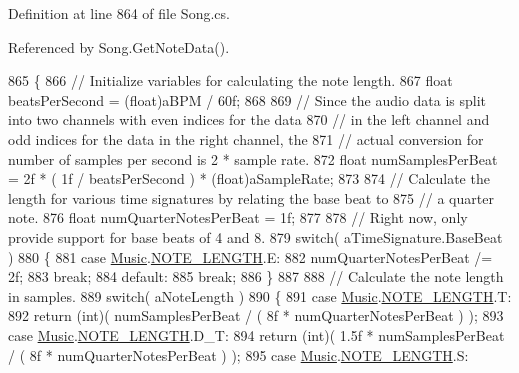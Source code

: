 Definition at line 864 of file Song.\+cs.



Referenced by Song.\+Get\+Note\+Data().


\begin{DoxyCode}
865     \{
866         \textcolor{comment}{// Initialize variables for calculating the note length.}
867         \textcolor{keywordtype}{float} beatsPerSecond = (float)aBPM / 60f;
868 
869         \textcolor{comment}{// Since the audio data is split into two channels with even indices for the data }
870         \textcolor{comment}{// in the left channel and odd indices for the data in the right channel, the}
871         \textcolor{comment}{// actual conversion for number of samples per second is 2 * sample rate.}
872         \textcolor{keywordtype}{float} numSamplesPerBeat = 2f * ( 1f / beatsPerSecond ) * (\textcolor{keywordtype}{float})aSampleRate;
873 
874         \textcolor{comment}{// Calculate the length for various time signatures by relating the base beat to }
875         \textcolor{comment}{// a quarter note. }
876         \textcolor{keywordtype}{float} numQuarterNotesPerBeat = 1f;
877 
878         \textcolor{comment}{// Right now, only provide support for base beats of 4 and 8.}
879         \textcolor{keywordflow}{switch}( aTimeSignature.BaseBeat )
880         \{
881             \textcolor{keywordflow}{case} \hyperlink{class_music}{Music}.\hyperlink{group___music_enums_gaf11b5f079adbb21c800b9eca1c5c3cbd}{NOTE\_LENGTH}.E:
882                 numQuarterNotesPerBeat /= 2f;
883                 \textcolor{keywordflow}{break};
884             \textcolor{keywordflow}{default}:
885                 \textcolor{keywordflow}{break};
886         \}
887 
888         \textcolor{comment}{// Calculate the note length in samples.}
889         \textcolor{keywordflow}{switch}( aNoteLength )
890         \{
891             \textcolor{keywordflow}{case} \hyperlink{class_music}{Music}.\hyperlink{group___music_enums_gaf11b5f079adbb21c800b9eca1c5c3cbd}{NOTE\_LENGTH}.T:
892                 \textcolor{keywordflow}{return} (\textcolor{keywordtype}{int})( numSamplesPerBeat / ( 8f * numQuarterNotesPerBeat ) );
893             \textcolor{keywordflow}{case} \hyperlink{class_music}{Music}.\hyperlink{group___music_enums_gaf11b5f079adbb21c800b9eca1c5c3cbd}{NOTE\_LENGTH}.D\_T:
894                 \textcolor{keywordflow}{return} (\textcolor{keywordtype}{int})( 1.5f * numSamplesPerBeat / ( 8f * numQuarterNotesPerBeat ) );
895             \textcolor{keywordflow}{case} \hyperlink{class_music}{Music}.\hyperlink{group___music_enums_gaf11b5f079adbb21c800b9eca1c5c3cbd}{NOTE\_LENGTH}.S:

\end{DoxyCode}
